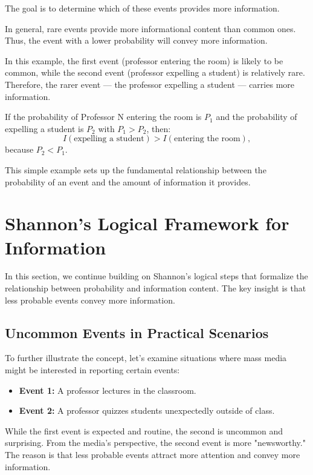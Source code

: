 \documentclass[12pt,a4paper]{article}
\newenvironment{exbox}[1][]{%
  \begin{tcolorbox}[enhanced, breakable, colback=excolor, colframe=brown!50!black, title=#1, fonttitle=\bfseries, arc=3pt, boxrule=0.5pt]
}{\end{tcolorbox}}
\newenvironment{rembox}[1][]{%
  \begin{tcolorbox}[enhanced, breakable, colback=gray!5, colframe=gray!50, title=#1, fonttitle=\bfseries, arc=3pt, boxrule=0.5pt]
}{\end{tcolorbox}}
\begin{document}
The goal is to determine which of these events provides more information.

\begin{rembox}[Comparing Probabilistic Events]
In general, rare events provide more informational content than common ones. Thus, the event with a lower probability will convey more information.
\end{rembox}

In this example, the first event (professor entering the room) is likely to be common, while the second event (professor expelling a student) is relatively rare. Therefore, the rarer event — the professor expelling a student — carries more information.

\begin{exbox}[Likelihood vs. Information]
If the probability of Professor N entering the room is $P_1$ and the probability of expelling a student is $P_2$ with $P_1 > P_2$, then:
\[
I(\text{expelling a student}) > I(\text{entering the room}),
\]
because $P_2 < P_1$.
\end{exbox}

This simple example sets up the fundamental relationship between the probability of an event and the amount of information it provides.
\section{Shannon's Logical Framework for Information}

In this section, we continue building on Shannon’s logical steps that formalize the relationship between probability and information content. The key insight is that less probable events convey more information.

\subsection{Uncommon Events in Practical Scenarios}
To further illustrate the concept, let's examine situations where mass media might be interested in reporting certain events:
\begin{itemize}
    \item \textbf{Event 1:} A professor lectures in the classroom.
    \item \textbf{Event 2:} A professor quizzes students unexpectedly outside of class.
\end{itemize}

While the first event is expected and routine, the second is uncommon and surprising. From the media’s perspective, the second event is more "newsworthy." The reason is that less probable events attract more attention and convey more information.
\end{document}
